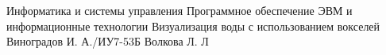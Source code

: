 \documentclass{bmstu}
\begin{document}
\renewcommand{\thelstlisting}{\arabic{lstlisting}}

\makecourseworktitle
    {Информатика и системы управления}
    {Программное обеспечение ЭВМ и информационные технологии}
    {Визуализация воды с использованием вокселей}
    {Виноградов И. А./ИУ7-53Б} 
    {Волкова Л. Л} 
    {} 

\setcounter{page}{3}
\maketableofcontents








\makebibliography
\end{document}
